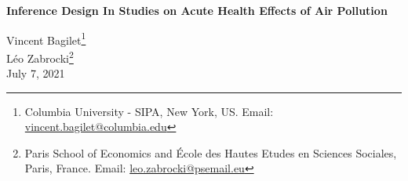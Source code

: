\documentclass[12pt]{article}
\begin{document}



\begin{titlepage}
\vspace*{-2cm}
\begin{flushleft}
\Huge{}\selectfont\textbf{Inference Design In Studies on Acute Health Effects of Air Pollution}
\end{flushleft}
\vspace*{0.1cm} 
\begin{flushleft}
{\large
Vincent Bagilet\footnote{Columbia University - SIPA, New York, US. Email: \url{vincent.bagilet@columbia.edu}}\\[3pt] 
Léo Zabrocki\footnote{ Paris School of Economics and
École des Hautes Etudes en Sciences Sociales, Paris, France. Email: \url{leo.zabrocki@psemail.eu}}
\\ [0.3cm] 
\normalsize{July 7, 2021} \\
}

\end{flushleft}


\begin{abstract}
\small
\noindent 


We explore statistical power characteristics of various empirical strategies implemented to estimate the short-term health effect of air pollution. Through an extensive literature review, we retrieve the estimates and standard errors of a large number of studies published on this topic. We find that a non-negligible share of studies may suffer from low power issues and could thereby exaggerate effect sizes. The analysis of published results highlights potential shortcomings of the literature but does not enable to precisely identify drivers of theses issues. We therefore run realistic simulations to investigate how statistical power varies with the treatment effect size, the number of observations, the proportion of treated units as well as the distribution of the outcome. Usual causal identification methods implemented in this literature, such as instrumental variable (IV), regression discontinuity design (RD) or difference-in-differences (DiD), may yield overestimated effect sizes. This issue is driven by the imprecision of the IV estimator and the small number of exogenous shocks usually exploited in DiD and RD designs. When focusing on particular groups such as the elderly or children, researchers should be aware that statistical power is lowered by the limited average count of health outcomes.

\bigskip
\end{abstract}
\setcounter{page}{0}
\thispagestyle{empty}
\end{titlepage}
\pagebreak \newpage
\end{document}
